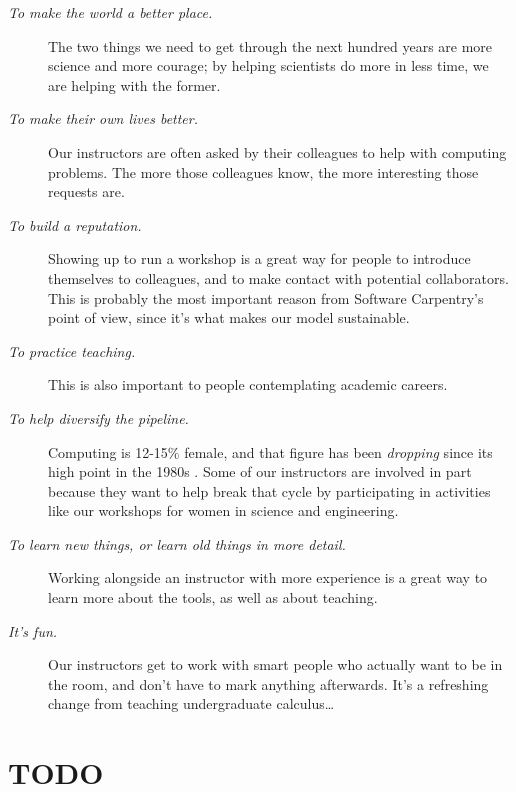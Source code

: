 \documentclass[10pt,a4paper,twocolumn]{article}
\begin{document}
\begin{description}

\item[\emph{To make the world a better place.}]  The two things we
  need to get through the next hundred years are more science and more
  courage; by helping scientists do more in less time, we are helping
  with the former.

\item[\emph{To make their own lives better.}]  Our instructors are
  often asked by their colleagues to help with computing problems.
  The more those colleagues know, the more interesting those requests
  are.

\item[\emph{To build a reputation.}]  Showing up to run a workshop is
  a great way for people to introduce themselves to colleagues, and to
  make contact with potential collaborators. This is probably the most
  important reason from Software Carpentry's point of view, since it's
  what makes our model sustainable.

\item[\emph{To practice teaching.}]
  This is also important to people contemplating academic careers.
 
\item[\emph{To help diversify the pipeline.}]  Computing is 12-15\%
  female, and that figure has been \emph{dropping} since its high
  point in the 1980s \cite{wic}. Some of our instructors are
  involved in part because they want to help break that cycle by
  participating in activities like our workshops for women in science
  and engineering.

\item[\emph{To learn new things, or learn old things in more detail.}]
  Working alongside an instructor with more experience is a great way
  to learn more about the tools, as well as about teaching.

\item[\emph{It's fun.}]  Our instructors get to work with smart people
  who actually want to be in the room, and don't have to mark anything
  afterwards. It's a refreshing change from teaching undergraduate
  calculus\ldots{}

\end{description}

\section*{TODO}
\end{document}
